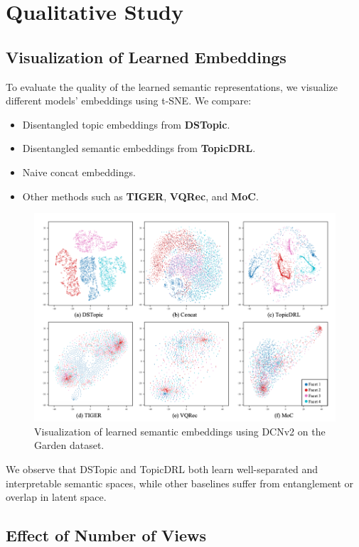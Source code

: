 \section{Qualitative Study}

\subsection{Visualization of Learned Embeddings}

To evaluate the quality of the learned semantic representations, we visualize different models' embeddings using t-SNE. We compare:
\begin{itemize}
    \item Disentangled topic embeddings from \textbf{DSTopic}.
    \item Disentangled semantic embeddings from \textbf{TopicDRL}.
    \item Naive concat embeddings.
    \item Other methods such as \textbf{TIGER}, \textbf{VQRec}, and \textbf{MoC}.
\end{itemize}

\begin{figure}[htbp]
    \centering
    \includegraphics[width=\textwidth]{Figures/Chapter5/fig3.png}
    \caption{Visualization of learned semantic embeddings using DCNv2 on the Garden dataset.}
    \label{fig:tsne}
\end{figure}

We observe that DSTopic and TopicDRL both learn well-separated and interpretable semantic spaces, while other baselines suffer from entanglement or overlap in latent space.

\subsection{Effect of Number of Views}

